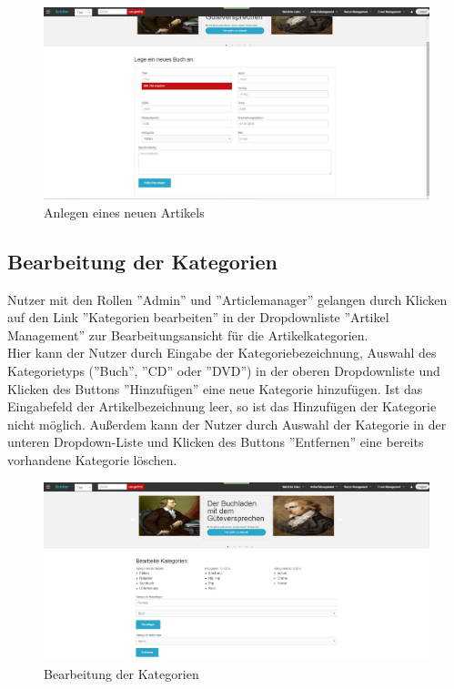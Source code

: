 \documentclass[a4paper]{article}
\begin{document}
\begin{figure}[ht]
\centering
\includegraphics[width=1.0\textwidth]{NeuerArtikel.jpg}
\caption{Anlegen eines neuen Artikels}
\end{figure}
\smallskip

\FloatBarrier

\subsection{Bearbeitung der Kategorien}

Nutzer mit den Rollen ''Admin'' und ''Articlemanager'' gelangen durch Klicken auf den Link ''Kategorien bearbeiten'' in der Dropdownliste ''Artikel Management'' zur Bearbeitungsansicht für die Artikelkategorien. \\
Hier kann der Nutzer durch Eingabe der Kategoriebezeichnung, Auswahl des Kategorietyps (''Buch'', ''CD'' oder ''DVD'') in der oberen Dropdownliste und Klicken des Buttons ''Hinzufügen'' eine neue Kategorie hinzufügen. Ist das Eingabefeld der Artikelbezeichnung leer, so ist das Hinzufügen der Kategorie nicht möglich. Außerdem kann der Nutzer durch Auswahl der Kategorie in der unteren Dropdown-Liste und Klicken des Buttons ''Entfernen'' eine bereits vorhandene Kategorie löschen. 

\begin{figure}[ht]
\centering
\includegraphics[width=1.0\textwidth]{Kategorien.jpg}
\caption{Bearbeitung der Kategorien}
\end{figure}
\smallskip
\end{document}
